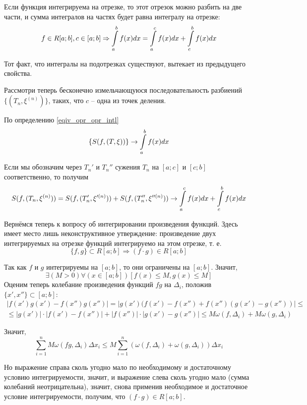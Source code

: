 \dokno

Если функция интегрируема на отрезке, то этот отрезок можно разбить на две части, и сумма интегралов на частях будет равна интегралу на отрезке:
$$
f\in R[a;b], c\in [a;b] \Rightarrow \int\limits_a^b f(x)dx = \int\limits_a^c f(x) dx + \int\limits_c^b f(x) dx
$$

\dokvo

Тот факт, что интегралы на подотрезках существуют, вытекает из предыдущего свойства.

Рассмотри теперь бесконечно измельчающуюся последовательность разбиений $\{(T_n,\xi^{(n)})\}$, таких, что $c$ -- одна из точек деления.

По определению \ref{eqiv_opr_opr_intl} 
$$
\{S(f,(T,\xi))\} \to \int\limits_a^b f(x) dx
$$

Если мы обозначим через $T_n'$ и $T_n''$ сужения $T_n$ на $[a;c]$ и $[c;b]$ соответственно, то получим
$$
S(f,(T_n,\xi^{(n)}))=S(f,(T_n',\xi'^{(n)}))+S(f,(T_n'',\xi''^{(n)}))\to \int\limits_a^c f(x) dx + \int\limits_c^b f(x) dx
$$

\dokno

Вернёмся теперь к вопросу об интегрировании произведения функций.
Здесь имеет место лишь неконструктивное утверждение: произведение двух интегрируемых на отрезке функций интегрируемо на этом отрезке, т. е.
$$
\{f,g\}\subset R[a;b] \Rightarrow (f\cdot g)\in R[a;b]
$$

\dokvo

Так как $f$ и $g$ интегрируемы на $[a;b]$, то они ограничены на $[a;b]$.
Значит,
$$
\exists(M>0)\forall(x\in[a;b])[f(x)\leq M, g(x)\leq M]
$$
Оценим теперь колебание произведения функций $fg$ на $\Delta_i$, положив $\{x',x''\}\subset[a;b]$:
\begin{multline*}
|f(x')g(x')-f(x'')g(x'')|=
|g(x')(f(x')-f(x'')+f(x'')(g(x')-g(x''))|\leq
\\\leq
|g(x')|\cdot|f(x')-f(x'')|+|f(x'')|\cdot|g(x')-g(x'')|\leq
M\omega(f,\Delta_i)+M\omega(g,\Delta_i)
\end{multline*}

Значит,
$$
\sum_{i=1}^n M\omega(fg,\Delta_i) \Delta x_i \leq M \sum_{i=1}^n \left( \omega(f,\Delta_i) + \omega(g,\Delta_i) \right)\Delta x_i 
$$

Но выражение справа сколь угодно мало по необходимому и достаточному условию интегрируемости, значит, и выражение слева сколь угодно мало (сумма колебаний неотрицательна), значит, снова применив необходимое и достаточное условие интегрируемости, получим, что $(f\cdot g)\in R[a;b]$.

\dokno

